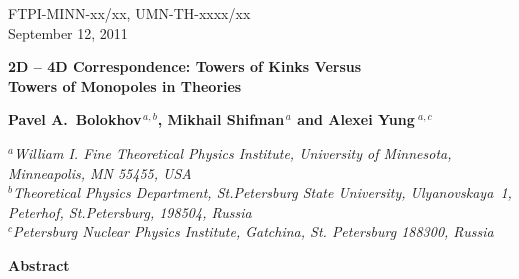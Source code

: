 \documentclass[epsfig,12pt]{article}
\begin{document}



\begin{titlepage}

\begin{flushright}
FTPI-MINN-xx/xx, UMN-TH-xxxx/xx\\
September 12, 2011
\end{flushright}

\vspace{1.1cm}

\begin{center}
{  \Large \bf  
			2D -- 4D Correspondence: Towers of Kinks Versus\\[1mm]  Towers of Monopoles
			in  Theories
			
}
\end{center}
\vspace{0.6cm}

\begin{center}

 {\large
 \bf   Pavel A.~Bolokhov$^{\,a,b}$,  Mikhail Shifman$^{\,a}$ and \bf Alexei Yung$^{\,\,a,c}$}
\end {center}

\begin{center}

$^a${\it  William I. Fine Theoretical Physics Institute, University of Minnesota,
Minneapolis, MN 55455, USA}\\
$^b${\it Theoretical Physics Department, St.Petersburg State University, Ulyanovskaya~1, 
	 Peterhof, St.Petersburg, 198504, Russia}\\
$^{c}${\it Petersburg Nuclear Physics Institute, Gatchina, St. Petersburg
188300, Russia
}
\end{center}


\vspace{0.7cm}


\begin{center}
{\large\bf Abstract}
\end{center}

\hspace{0.3cm}
\vspace{2cm}

\end{titlepage}

\newpage
\end{document}
